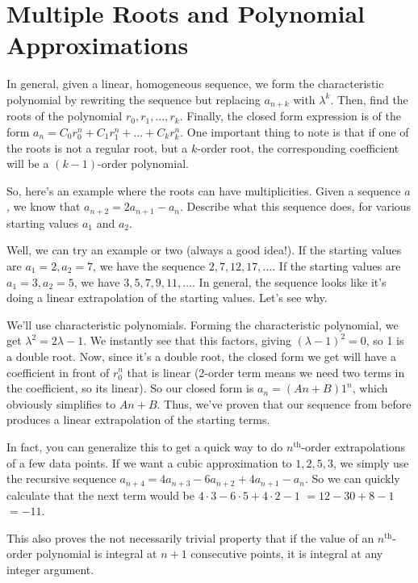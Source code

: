 \documentclass[12pt,letterpaper]{article}
\renewcommand{\th}{\ensuremath{^{\text{th}}}}
\begin{document}
\section{Multiple Roots and Polynomial Approximations}
In general, given a linear, homogeneous sequence, we form the
characteristic polynomial by rewriting the sequence but replacing
$a_{n+k}$ with $\lambda^k$. Then, find the roots of the polynomial
$r_0, r_1, ..., r_k$. Finally, the closed form expression is of the
form $a_n = C_0 r_0^n + C_1 r_1^n + ... + C_k r_k^n$. One important
thing to note is that if one of the roots is not a regular root, but a
$k$-order root, the corresponding coefficient will be a $(k-1)$-order
polynomial.

So, here's an example where the roots can have multiplicities. Given a
sequence $a$, we know that $a_{n+2} = 2a_{n+1} - a_n$. Describe what
this sequence does, for various starting values $a_1$ and $a_2$.

Well, we can try an example or two (always a good idea!). If the starting
values are $a_1 = 2, a_2 = 7$, we have the sequence $2, 7, 12, 17, \ldots$.
If the starting values are $a_1 = 3, a_2 = 5$, we have $3, 5, 7, 9, 11, \ldots$.
In general, the sequence looks like it's doing a linear extrapolation of
the starting values. Let's see why.

We'll use characteristic polynomials. Forming the characteristic polynomial,
we get $\lambda^2 = 2\lambda - 1$. We instantly see that this factors, giving
$(\lambda - 1)^2 = 0$, so 1 is a double root. Now, since it's a double root,
the closed form we get will have a coefficient in front of $r_0^n$ that is
linear (2-order term means we need two terms in the coefficient, so its linear).
So our closed form is $a_n = (An + B)1^n$, which obviously simplifies to $An+B$.
Thus, we've proven that our sequence from before produces a linear extrapolation
of the starting terms.

In fact, you can generalize this to get a quick way to do $n\th$-order extrapolations
of a few data points. If we want a cubic approximation to $1, 2, 5, 3$, we simply
use the recursive sequence $a_{n+4} = 4a_{n+3} - 6a_{n+2} + 4a_{n+1} - a_n$. So we
can quickly calculate that the next term would be $4 \cdot 3 - 6 \cdot 5 + 4 \cdot
2 - 1$ $= 12 - 30 + 8 - 1$ $=-11$.

This also proves the not necessarily trivial property that if the value of an
$n\th$-order polynomial is integral at $n+1$ consecutive points, it is integral
at any integer argument.
\end{document}

